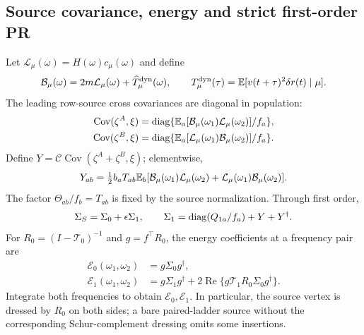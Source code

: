 \subsection{Source covariance, energy and strict first-order PR}
Let $\mathcal L_\mu(\omega)=H(\omega)c_\mu(\omega)$ and define
\[
 \mathcal B_\mu(\omega)=2m\mathcal L_\mu(\omega)
            +\widehat T_\mu^{\rm dyn}(\omega),\qquad
 T_\mu^{\rm dyn}(\tau)=
       \mathbb E[v(t+\tau)^2\delta r(t)\mid\mu].
\]
The leading row-source cross covariances are diagonal in population:
\begin{align*}
 \operatorname{Cov}(\zeta^A,\xi)
 &=\operatorname{diag}\{\mathbb E_a[\mathcal B_\mu(\omega_1)
                      \mathcal L_\mu(\omega_2)]/f_a\},\\
 \operatorname{Cov}(\zeta^B,\xi)
 &=\operatorname{diag}\{\mathbb E_a[\mathcal L_\mu(\omega_1)
                      \mathcal B_\mu(\omega_2)]/f_a\}.
\end{align*}
Define $Y=\mathcal C\operatorname{Cov}(\zeta^A+\zeta^B,\xi)$; elementwise,
\[
 Y_{ab}=\tfrac12 b_aT_{ab}\mathbb E_b[
        \mathcal B_\mu(\omega_1)\mathcal L_\mu(\omega_2)
       +\mathcal L_\mu(\omega_1)\mathcal B_\mu(\omega_2)].
\]
The factor $\Theta_{ab}/f_b=T_{ab}$ is fixed by the source normalization.
Through first order,
\[
 \Sigma_S=\Sigma_0+\epsilon\Sigma_1,\qquad
 \Sigma_1=\operatorname{diag}(Q_{1a}/f_a)+Y+Y^\dagger.
\]
For $R_0=(I-\mathcal T_0)^{-1}$ and $g=f^\top R_0$, the energy coefficients
at a frequency pair are
\begin{align*}
 \mathcal E_0(\omega_1,\omega_2)&=g\Sigma_0g^\dagger,\\
 \mathcal E_1(\omega_1,\omega_2)&=g\Sigma_1g^\dagger
       +2\operatorname{Re}\{g\mathcal T_1R_0\Sigma_0g^\dagger\}.
\end{align*}
Integrate both frequencies to obtain $\mathcal E_0,\mathcal E_1$. In particular,
the source vertex is dressed by $R_0$ on both sides; a bare paired-ladder source
without the corresponding Schur-complement dressing omits some insertions.

